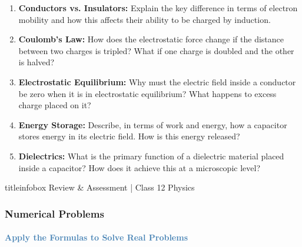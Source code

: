\begin{frame}
\begin{frame}
\begin{keybox}
\vspace{0.1cm}
\begin{enumerate}
    \item \textbf{Conductors vs. Insulators:} Explain the key difference in terms of electron mobility and how this affects their ability to be charged by induction.
    \item \textbf{Coulomb's Law:} How does the electrostatic force change if the distance between two charges is tripled? What if one charge is doubled and the other is halved?
    \item \textbf{Electrostatic Equilibrium:} Why must the electric field inside a conductor be zero when it is in electrostatic equilibrium? What happens to excess charge placed on it?
\end{enumerate}
\vspace{0.1cm}
\end{keybox}

\vspace{0.3cm}

\begin{examplebox}
\vspace{0.1cm}
\begin{enumerate}
    \setcounter{enumi}{3}
    \item \textbf{Energy Storage:} Describe, in terms of work and energy, how a capacitor stores energy in its electric field. How is this energy released?
    \item \textbf{Dielectrics:} What is the primary function of a dielectric material placed inside a capacitor? How does it achieve this at a microscopic level?
\end{enumerate}
\vspace{0.1cm}
\end{examplebox}

\vfill

\begin{beamercolorbox}[wd=\textwidth,ht=0.5cm,dp=0.1cm,center]{titleinfobox}
    \small\color{coolgray} Review & Assessment | Class 12 Physics
\end{beamercolorbox}
\end{frame}

\begin{frame}
\frametitle{\textsf{\textbf{Numerical Problems}}}
\framesubtitle{\textcolor{steelblue}{Apply the Formulas to Solve Real Problems}}


\end{frame}
\end{frame}
